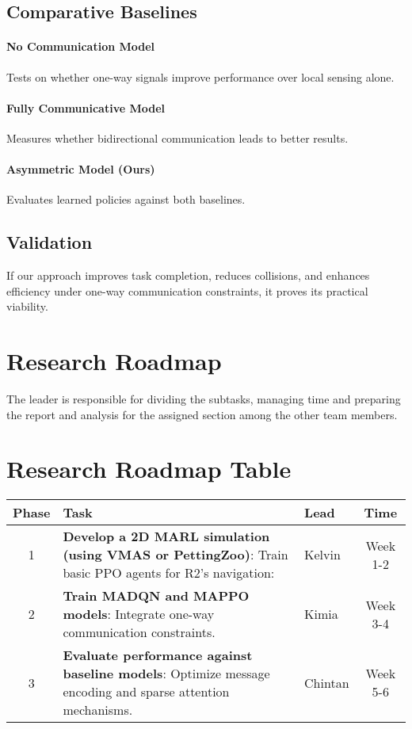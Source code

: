 \documentclass[a4paper,11pt]{article}
\begin{document}
\subsection{Comparative Baselines} 
\paragraph{No Communication Model} Tests on whether one-way signals improve performance over local sensing alone.

\paragraph{Fully Communicative Model} Measures whether bidirectional communication leads to better results.

\paragraph{Asymmetric Model (Ours)} Evaluates learned policies against both baselines.

\subsection{Validation} 
If our approach improves task completion, reduces collisions, and enhances efficiency under one-way communication constraints, it proves its practical viability.

\section{Research Roadmap} 
The leader is responsible for dividing the subtasks, managing time and preparing the report and analysis for the assigned section among the other team members. 

\section*{Research Roadmap Table}
\vspace{-3mm}
\begin{tabular}{|c|p{5cm}|p{3cm}|c|}
    \hline
    \textbf{Phase} & \textbf{Task} & \textbf{Lead} & \textbf{Time} \\ \hline
    1 & \textbf{Develop a 2D MARL simulation (using VMAS or PettingZoo)}: \newline Train basic PPO agents for R2’s navigation: & Kelvin & Week 1-2 \\ \hline
    2 & \textbf{Train MADQN and MAPPO models}: \newline Integrate one-way communication constraints. & Kimia & Week 3-4 \\ \hline
    3 & \textbf{Evaluate performance against baseline models}: \newline Optimize message encoding and sparse attention mechanisms. & Chintan & Week 5-6 \\ \hline
\end{tabular}
\end{document}
